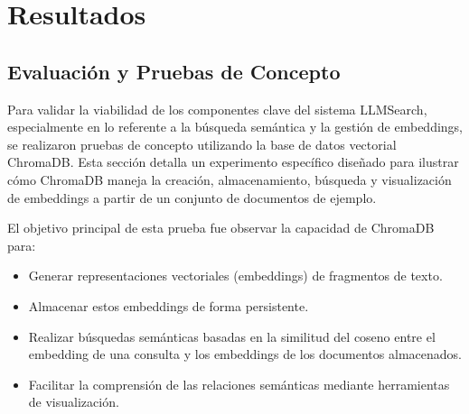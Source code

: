 
\chapter{Resultados}
\label{resultados}

\section{Evaluación y Pruebas de Concepto}
\label{sec:evaluacion}

Para validar la viabilidad de los componentes clave del sistema LLMSearch, especialmente en lo referente a la búsqueda semántica y la gestión de embeddings, se realizaron pruebas de concepto utilizando la base de datos vectorial ChromaDB. Esta sección detalla un experimento específico diseñado para ilustrar cómo ChromaDB maneja la creación, almacenamiento, búsqueda y visualización de embeddings a partir de un conjunto de documentos de ejemplo.

El objetivo principal de esta prueba fue observar la capacidad de ChromaDB para:
\begin{itemize}
    \item Generar representaciones vectoriales (embeddings) de fragmentos de texto.
    \item Almacenar estos embeddings de forma persistente.
    \item Realizar búsquedas semánticas basadas en la similitud del coseno entre el embedding de una consulta y los embeddings de los documentos almacenados.
    \item Facilitar la comprensión de las relaciones semánticas mediante herramientas de visualización.
\end{itemize}

